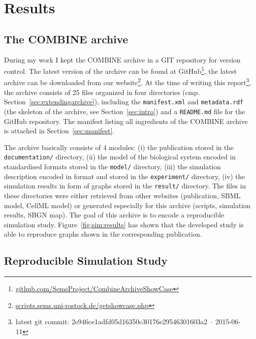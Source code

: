 
\section{Results}

\subsection{The COMBINE archive}
During my work I kept the COMBINE archive in a GIT repository for version control.
The latest version of the archive can be found at GitHub\footnote{\href{https://github.com/SemsProject/CombineArchiveShowCase}{github.com/SemsProject/CombineArchiveShowCase}}, the latest archive can be downloaded from our website\footnote{\href{http://scripts.sems.uni-rostock.de/getshowcase.php}{scripts.sems.uni-rostock.de/getshowcase.php}}.
At the time of writing this report\footnote{latest git commit: 2e946ce1adfd05d16350c30176e29546301603a2 -- 2015-06-11}, the archive consists of 25 files organized in four directories (cmp. Section~\ref{sec:extendingarchive}), including the \texttt{manifest.xml} and \texttt{metadata.rdf} (the skeleton of the archive, see Section~\ref{sec:intro}) and a \texttt{README.md} file for the GitHub repository.
The manifest listing all ingredients of the COMBINE archive is attached in Section~\ref{sec:manifest}.

The archive basically consists of 4 modules: (i) the publication stored in the \texttt{documentation/} directory, (ii) the model of the biological system encoded in standardised formats stored in the \texttt{model/} directory, (iii) the simulation description encoded in \sedml format and stored in the \texttt{experiment/} directory, (iv) the simulation results in form of graphs stored in the \texttt{result/} directory.
The files in these directories were either retrieved from other websites (publication, SBML model, CellML model) or generated especially for this archive (\sedml scripts, simulation results, SBGN map).
The goal of this archive is to encode a reproducible simulation study.
Figure~\ref{fig:sim:results} has shown that the developed study is able to reproduce graphs shown in the corresponding publication.

\subsection{Reproducible Simulation Study}

